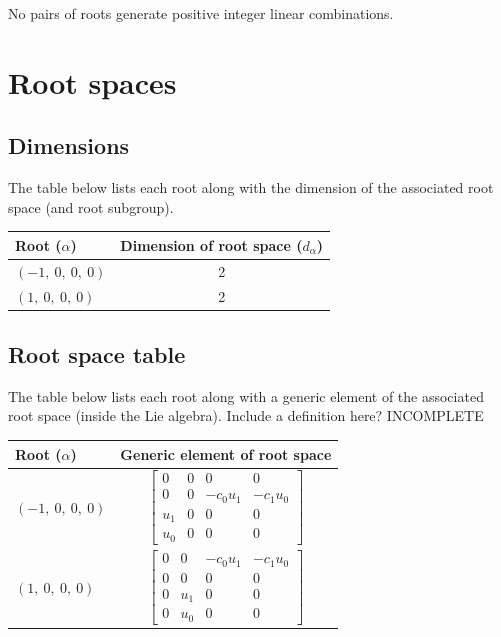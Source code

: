 \documentclass[11pt]{article}
\newcommand{\noi}{\noindent}
\theoremstyle{definition}
\begin{document}
\noindent No pairs of roots generate positive integer linear combinations.


\newpage
\section{Root spaces}

\subsection{Dimensions}

The table below lists each root along with the dimension of the associated root space (and root subgroup).

\bigskip

\noindent \begin{tabular}{|l|c|}
    \hline
    \textbf{Root ($\alpha$)} & \textbf{Dimension of root space ($d_{\alpha}$)} \\
    \hline
    $\left( -1, \  0, \  0, \  0\right)$ & 2 \\
    \hline
    $\left( 1, \  0, \  0, \  0\right)$ & 2 \\
    \hline
\end{tabular}


\subsection{Root space table}

\noi The table below lists each root along with a generic element of the associated root space (inside the Lie algebra). Include a definition here? INCOMPLETE

\bigskip

\noindent \begin{tabular}{|l|c|}
    \hline
    \textbf{Root ($\alpha$)} & \textbf{Generic element of root space} \\
    \hline
    $\left( -1, \  0, \  0, \  0\right)$ & $\left[\begin{matrix}0 & 0 & 0 & 0\\0 & 0 & - c_{0} u_{1} & - c_{1} u_{0}\\u_{1} & 0 & 0 & 0\\u_{0} & 0 & 0 & 0\end{matrix}\right]$ \\
    \hline
    $\left( 1, \  0, \  0, \  0\right)$ & $\left[\begin{matrix}0 & 0 & - c_{0} u_{1} & - c_{1} u_{0}\\0 & 0 & 0 & 0\\0 & u_{1} & 0 & 0\\0 & u_{0} & 0 & 0\end{matrix}\right]$ \\
    \hline
\end{tabular}
\end{document}
